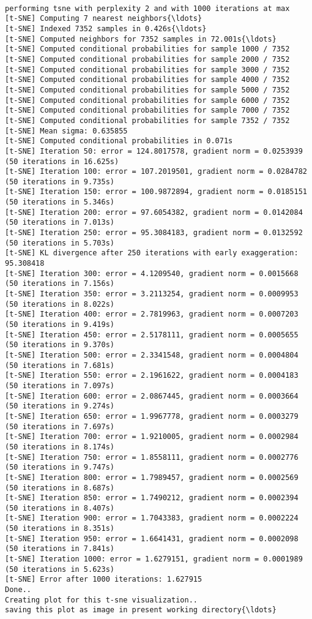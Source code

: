 \documentclass[11pt]{article}
\begin{document}
    \begin{Verbatim}[commandchars=\\\{\}]

performing tsne with perplexity 2 and with 1000 iterations at max
[t-SNE] Computing 7 nearest neighbors{\ldots}
[t-SNE] Indexed 7352 samples in 0.426s{\ldots}
[t-SNE] Computed neighbors for 7352 samples in 72.001s{\ldots}
[t-SNE] Computed conditional probabilities for sample 1000 / 7352
[t-SNE] Computed conditional probabilities for sample 2000 / 7352
[t-SNE] Computed conditional probabilities for sample 3000 / 7352
[t-SNE] Computed conditional probabilities for sample 4000 / 7352
[t-SNE] Computed conditional probabilities for sample 5000 / 7352
[t-SNE] Computed conditional probabilities for sample 6000 / 7352
[t-SNE] Computed conditional probabilities for sample 7000 / 7352
[t-SNE] Computed conditional probabilities for sample 7352 / 7352
[t-SNE] Mean sigma: 0.635855
[t-SNE] Computed conditional probabilities in 0.071s
[t-SNE] Iteration 50: error = 124.8017578, gradient norm = 0.0253939 (50 iterations in 16.625s)
[t-SNE] Iteration 100: error = 107.2019501, gradient norm = 0.0284782 (50 iterations in 9.735s)
[t-SNE] Iteration 150: error = 100.9872894, gradient norm = 0.0185151 (50 iterations in 5.346s)
[t-SNE] Iteration 200: error = 97.6054382, gradient norm = 0.0142084 (50 iterations in 7.013s)
[t-SNE] Iteration 250: error = 95.3084183, gradient norm = 0.0132592 (50 iterations in 5.703s)
[t-SNE] KL divergence after 250 iterations with early exaggeration: 95.308418
[t-SNE] Iteration 300: error = 4.1209540, gradient norm = 0.0015668 (50 iterations in 7.156s)
[t-SNE] Iteration 350: error = 3.2113254, gradient norm = 0.0009953 (50 iterations in 8.022s)
[t-SNE] Iteration 400: error = 2.7819963, gradient norm = 0.0007203 (50 iterations in 9.419s)
[t-SNE] Iteration 450: error = 2.5178111, gradient norm = 0.0005655 (50 iterations in 9.370s)
[t-SNE] Iteration 500: error = 2.3341548, gradient norm = 0.0004804 (50 iterations in 7.681s)
[t-SNE] Iteration 550: error = 2.1961622, gradient norm = 0.0004183 (50 iterations in 7.097s)
[t-SNE] Iteration 600: error = 2.0867445, gradient norm = 0.0003664 (50 iterations in 9.274s)
[t-SNE] Iteration 650: error = 1.9967778, gradient norm = 0.0003279 (50 iterations in 7.697s)
[t-SNE] Iteration 700: error = 1.9210005, gradient norm = 0.0002984 (50 iterations in 8.174s)
[t-SNE] Iteration 750: error = 1.8558111, gradient norm = 0.0002776 (50 iterations in 9.747s)
[t-SNE] Iteration 800: error = 1.7989457, gradient norm = 0.0002569 (50 iterations in 8.687s)
[t-SNE] Iteration 850: error = 1.7490212, gradient norm = 0.0002394 (50 iterations in 8.407s)
[t-SNE] Iteration 900: error = 1.7043383, gradient norm = 0.0002224 (50 iterations in 8.351s)
[t-SNE] Iteration 950: error = 1.6641431, gradient norm = 0.0002098 (50 iterations in 7.841s)
[t-SNE] Iteration 1000: error = 1.6279151, gradient norm = 0.0001989 (50 iterations in 5.623s)
[t-SNE] Error after 1000 iterations: 1.627915
Done..
Creating plot for this t-sne visualization..
saving this plot as image in present working directory{\ldots}

    \end{Verbatim}
\end{document}
